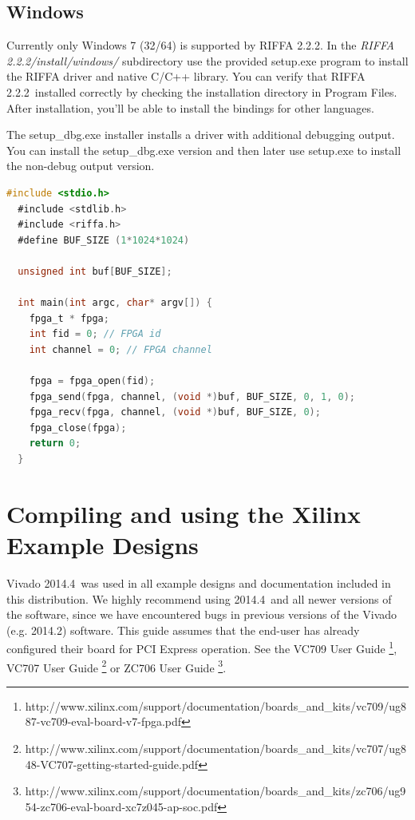 \documentclass{refrep}
\newcommand{\VivadoVer}{2014.4}
\newcommand{\RIFFAVer}{2.2.2}
\newcommand{\Directory}[1]{\textit{#1}}
\begin{document}
\section{Windows}
Currently only Windows 7 (32/64) is supported by RIFFA \RIFFAVer. In the
\Directory{RIFFA \RIFFAVer/install/windows/} subdirectory use the
provided setup.exe program to install the RIFFA driver and native C/C++
library. You can verify that RIFFA \RIFFAVer~installed correctly by checking
the installation directory in Program Files. After installation, you'll be able
to install the bindings for other languages.

The setup\_dbg.exe installer installs a driver with additional debugging output.
You can install the setup\_dbg.exe version and then later use setup.exe to
install the non-debug output version.

\begin{lstlisting}[basicstyle=\footnotesize\ttfamily,language=C,
    commentstyle=\color{red},label=Listing:RIFFA:Include,
    caption=Inclusion of the RIFFA header files in a user application,frame=single]
  #include <stdio.h>
  #include <stdlib.h>
  #include <riffa.h>
  #define BUF_SIZE (1*1024*1024)

  unsigned int buf[BUF_SIZE];

  int main(int argc, char* argv[]) {
    fpga_t * fpga;
    int fid = 0; // FPGA id
    int channel = 0; // FPGA channel

    fpga = fpga_open(fid);
    fpga_send(fpga, channel, (void *)buf, BUF_SIZE, 0, 1, 0);
    fpga_recv(fpga, channel, (void *)buf, BUF_SIZE, 0);
    fpga_close(fpga);
    return 0;
  }
\end{lstlisting}


\chapter{Compiling and using the Xilinx Example Designs}
Vivado \VivadoVer~was used in all example designs and documentation included in
this distribution. We highly recommend using \VivadoVer~and all newer versions
of the software, since we have encountered bugs in previous versions of the
Vivado (e.g. 2014.2) software. This guide assumes that the end-user has already
configured their board for PCI Express operation. See the VC709 User Guide
\footnote{http://www.xilinx.com/support/documentation/boards\_and\_kits/vc709/ug887-vc709-eval-board-v7-fpga.pdf},
VC707 User Guide
\footnote{http://www.xilinx.com/support/documentation/boards\_and\_kits/vc707/ug848-VC707-getting-started-guide.pdf}
or ZC706 User Guide
\footnote{http://www.xilinx.com/support/documentation/boards\_and\_kits/zc706/ug954-zc706-eval-board-xc7z045-ap-soc.pdf}.
\end{document}
